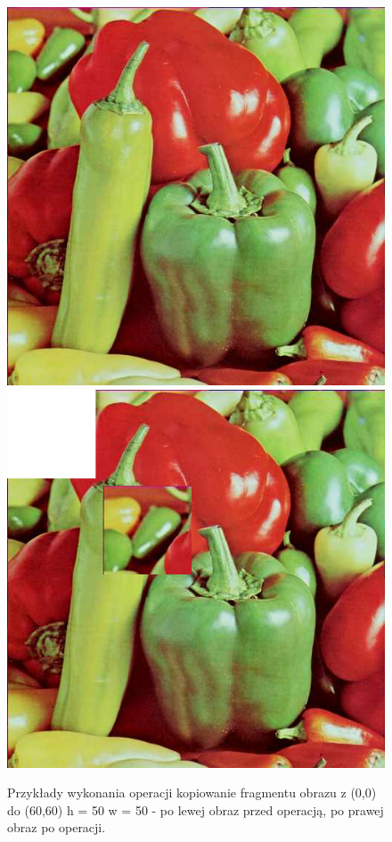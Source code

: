 \documentclass{article}
\begin{document}
\begin{figure}[!htb]
\centering
\includegraphics[scale=0.2]{img/peppers_24bit.png}
\includegraphics[scale=0.2]{img/Kopiuj_Wklej_Obraz_peppers_24bit.png} 
\caption{Przykłady wykonania operacji kopiowanie fragmentu obrazu z (0,0) do (60,60) h = 50 w = 50 - po lewej obraz przed operacją, po prawej obraz po operacji. }
\end{figure}
\end{document}
